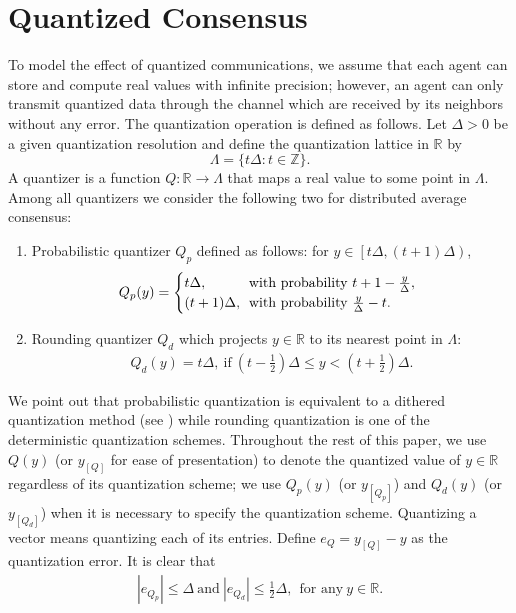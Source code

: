 \documentclass[journal]{IEEEtran}
\begin{document}
\section{Quantized Consensus}
\label{sec:problemformulation}
To model the effect of quantized communications, we assume that each agent can store and compute real values with infinite precision; however, an agent can only transmit quantized data through the channel which are received by its neighbors without any error. The quantization operation is defined as follows. Let $\Delta>0$ be a given quantization resolution and define the quantization lattice in $\mathbb{R}$ by $$ \Lambda = \{t\Delta: t\in\mathbb{Z}\}.$$ A quantizer is a function $Q: \mathbb{R}\to\Lambda$ that maps a real value to some point in $\Lambda$. 
Among all quantizers we consider the following two for distributed average consensus:
\begin{enumerate}
\item Probabilistic quantizer $Q_p$ defined as follows:
for $y \in\left [t\Delta,(t+1)\Delta\right)$,
\begin{equation}
\label{eqn:Qp}
\begin{aligned}
\hspace{-0.08in}Q_p(y) =
\begin{cases}
t\Delta,&\hspace{-0.05in}\text{with probability}~t+1-\frac{y}{\Delta}, \\
(t+1)\Delta,&\hspace{-0.05in}\text{with probability}~\frac{y}{\Delta}-t.
\end{cases}
\end{aligned}
\end{equation}\item Rounding quantizer $Q_d$ which projects $y\in\mathbb{R}$ to its nearest point in $\Lambda$:
\begin{equation}
\label{eqn:Qd}
\begin{aligned}
Q_d(y) = t \Delta,~\text{if}~\left(t-\frac{1}{2}\right)\Delta\leq y< \left(t+\frac{1}{2}\right)\Delta.
\end{aligned}
\end{equation}\end{enumerate}
We point out that probabilistic quantization is equivalent to a dithered quantization method (see \cite[Lemma 2]{Aysal2008}) while rounding quantization is one of the deterministic quantization schemes. Throughout the rest of this paper, we use $Q(y)$ (or $y_{[Q]}$ for ease of presentation) to denote the quantized value of $y\in\mathbb{R}$ regardless of its quantization scheme; we use $Q_p(y)$ (or $y_{[Q_p]}$) and $Q_d(y)$ (or $y_{[Q_d]}$) when it is necessary to specify the quantization scheme. Quantizing a vector means quantizing each of its entries. Define $e_{Q}=y_{[Q]}-y$ as the quantization error. It is clear that
\begin{equation}
\label{eqn:Qerror}
\begin{aligned}
\left |e_{Q_p}\right|\leq\Delta~\text{and}~\left|e_{Q_d}\right|\leq \frac{1}{2}\Delta,~~\text{for any}~y\in\mathbb{R}.
\end{aligned}
\end{equation}
\end{document}
